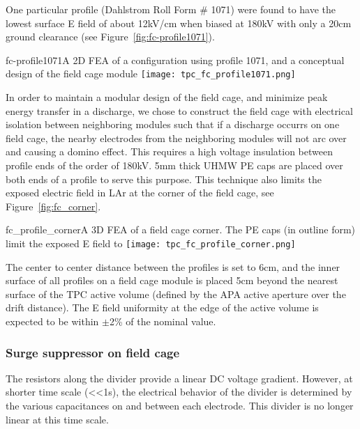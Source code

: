 One particular profile (Dahlstrom Roll Form \# 1071) were found to have the lowest surface E field of about 12kV/cm when biased at 180kV with only a 20cm ground clearance (see Figure~\ref{fig:fc-profile1071}).

\begin{cdrfigure}{fc-profile1071}{A 2D FEA of a configuration using profile 1071, and a conceptual design of the field cage module}
\texttt{[image: tpc\_fc\_profile1071.png]}
\end{cdrfigure}
  
In order to maintain a modular design of the field cage, and minimize peak energy transfer in a discharge, we chose to construct the field cage with electrical isolation between neighboring modules such that if a discharge occurrs on one field cage, the nearby electrodes from the neighboring modules will not arc over and causing a domino effect.  This requires a high voltage insulation between profile ends of the order of 180kV.  5mm thick UHMW PE caps are placed over both ends of a profile to serve this purpose. This technique also limits the exposed electric field in LAr at the corner of the field cage, see Figure~\ref{fig:fc_corner}.

\begin{cdrfigure}{fc_profile_corner}{A 3D FEA of a field cage corner.  The PE caps (in outline form) limit the exposed E field to}
\texttt{[image: tpc\_fc\_profile\_corner.png]}
\end{cdrfigure}

The center to center distance between the profiles is set to 6cm, and the inner surface of all profiles on a field cage module is placed 5cm beyond the nearest surface of the TPC active volume (defined by the APA active aperture over the drift distance). The E field uniformity at the edge of the active volume is expected to be within $\pm$2\% of the nominal value.



\subsubsection{Surge suppressor on field cage}

The resistors along the divider provide a linear DC voltage gradient. However, at shorter time scale (<<1s), the electrical behavior of the divider is determined by the various capacitances on and between each electrode.  This divider is no longer linear at this time scale. 

